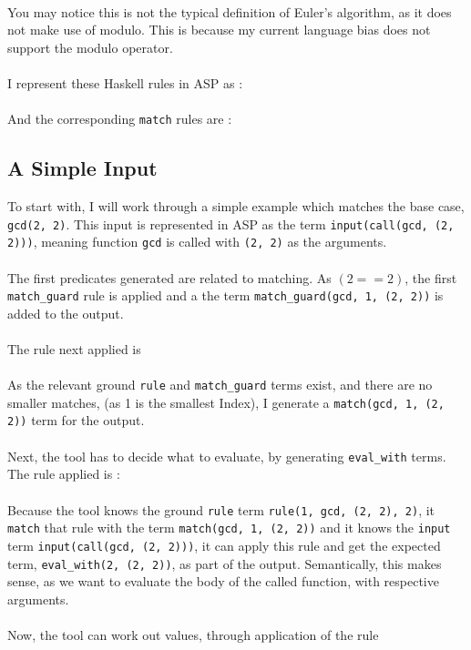  
\mbox{} \\
You may notice this is not the typical definition of Euler's algorithm, as it does not make use of modulo. This is because my current language bias does not support the modulo operator. \\ \\
I represent these Haskell rules in ASP as :\\

 
\mbox{} \\
And the corresponding \lstinline{match} rules are :\\ %

 

\subsection{A Simple Input}
To start with, I will work through a simple example which matches the base case, \lstinline{gcd(2, 2)}. This input is represented in ASP as the term \lstinline{input(call(gcd, (2, 2)))}, meaning function \lstinline{gcd} is called with \lstinline{(2, 2)} as the arguments. \\ \\
The first predicates generated are related to matching. As $(2 == 2)$, the first \lstinline{match_guard} rule is applied and a the term \lstinline{match_guard(gcd, 1, (2, 2))} is added to the output.\\ \\
The rule next applied is \\


\mbox{} \\
As the relevant ground \lstinline{rule} and \lstinline{match_guard} terms exist, and there are no smaller matches, (as 1 is the smallest Index), I generate a \lstinline{match(gcd, 1, (2, 2))} term for the output. \\ \\ %
Next, the tool has to decide what to evaluate, by generating \lstinline{eval_with} terms. The rule applied is :\\ %


\mbox{} \\
Because the tool knows the ground \lstinline{rule} term \lstinline{rule(1, gcd, (2, 2), 2)}, it \lstinline{match} that rule with the term \lstinline{match(gcd, 1, (2, 2))} and it knows the \lstinline{input} term \lstinline{input(call(gcd, (2, 2)))}, it can apply this rule and get the expected term, \lstinline{eval_with(2, (2, 2))}, as part of the output. Semantically, this makes sense, as we want to evaluate the body of the called function, with respective arguments. \\ \\%
Now, the tool can work out values, through application of the rule \\

